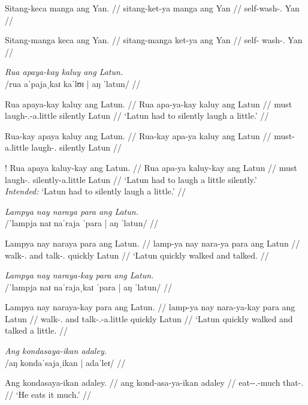 \documentclass[12pt,a4paper]{scrartcl}
\newcommand{\PargI}{{\Parg}.{\Inan}}
\newcommand{\TsgM}{{\Tsg}.{\M}}
\begin{document}
\a\ljudge*\begingl
\gla Sitang-keca manga ang Yan. //
\glb sitang-ket-ya manga ang Yan //
\glc self-wash-\TsgM{} \Prog{} \Aarg{} Yan //
\endgl

\a\ljudge*\begingl
\gla Sitang-manga keca ang Yan. //
\glb sitang-manga ket-ya ang Yan //
\glc self-\Prog{} wash-\TsgM{} \Aarg{} Yan //
\endgl

\xe

\pex
\a\begingl
	\glpreamble \textit{Rua apaya-kay kaluy ang Latun.} \\
		/rua aˈpajaˌkaɪ kaˈlʊɪ | aŋ ˈlatun/ //

	\gla Rua apaya-kay kaluy ang Latun. //
	\glb Rua apa-ya-kay kaluy ang Latun //
	\glc must laugh-\TsgM{}-a.little silently \Aarg{} Latun //
	\glft `Latun had to silently laugh a little.' //
\endgl

\a\ljudge*\begingl
	\gla Rua-kay apaya kaluy ang Latun. //
	\glb Rua-kay apa-ya kaluy ang Latun //
	\glc must-a.little laugh-\TsgM{} silently \Aarg{} Latun //
\endgl

\a\ljudge!\begingl
	\gla Rua apaya kaluy-kay ang Latun. //
	\glb Rua apa-ya kaluy-kay ang Latun //
	\glc must laugh-\TsgM{} silently-a.little \Aarg{} Latun //
	\glft `Latun had to laugh a little silently.' \\
		\textit{Intended:} `Latun had to silently laugh a little.' //
\endgl

\xe

\ex\begingl
\glpreamble \textit{Lampya nay naraya para ang Latun.} \\
	/ˈlampja naɪ naˈraja ˈpara | aŋ ˈlatun/ //

\gla Lampya nay naraya para ang Latun. //
\glb lamp-ya nay nara-ya para ang Latun //
\glc walk-\TsgM{} and talk-\TsgM{} quickly \Aarg{} Latun //
\glft `Latun quickly walked and talked. //
\endgl\xe

\ex\begingl
\glpreamble \textit{Lampya nay naraya-kay para ang Latun.} \\
	/ˈlampja naɪ naˈrajaˌkaɪ ˈpara | aŋ ˈlatun/ //

\gla Lampya nay naraya-kay para ang Latun. //
\glb lamp-ya nay nara-ya-kay para ang Latun //
\glc walk-\TsgM{} and talk-\TsgM{}-a.little quickly \Aarg{} Latun //
\glft `Latun quickly walked and talked a little. //
\endgl\xe

\ex\begingl
\glpreamble \textit{Ang kondasaya-ikan adaley.} \\
	/aŋ kondaˈsajaˌikan | adaˈleɪ/ //

\gla Ang kondasaya-ikan adaley. //
\glb ang kond-asa-ya-ikan adaley //
\glc \AgtT{} eat-\Hab{}-\TsgM{}-much that-\PargI{} //
\glft `He eats it much.' //
\endgl\xe
\end{document}

